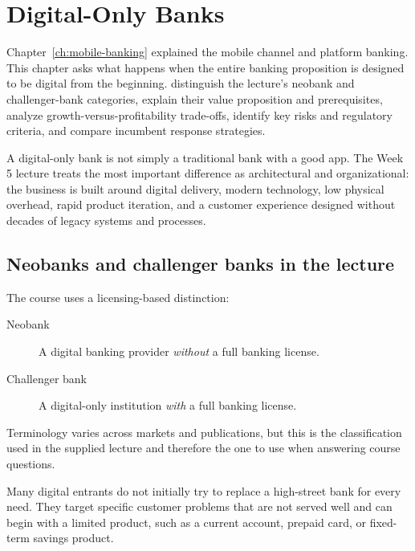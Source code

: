 \chapter{Digital-Only Banks}
\label{ch:digital-banks}

\chapterguide%
  {Chapter~\ref{ch:mobile-banking} explained the mobile channel and platform banking. This chapter asks what happens when the entire banking proposition is designed to be digital from the beginning.}
  {distinguish the lecture's neobank and challenger-bank categories, explain their value proposition and prerequisites, analyze growth-versus-profitability trade-offs, identify key risks and regulatory criteria, and compare incumbent response strategies.}

A digital-only bank is not simply a traditional bank with a good app. The Week 5 lecture treats the most important difference as architectural and organizational: the business is built around digital delivery, modern technology, low physical overhead, rapid product iteration, and a customer experience designed without decades of legacy systems and processes.

\section{Neobanks and challenger banks in the lecture}

The course uses a licensing-based distinction:

\begin{description}
  \item[Neobank] A digital banking provider \emph{without} a full banking license.
  \item[Challenger bank] A digital-only institution \emph{with} a full banking license.
\end{description}

Terminology varies across markets and publications, but this is the classification used in the supplied lecture and therefore the one to use when answering course questions.

Many digital entrants do not initially try to replace a high-street bank for every need. They target specific customer problems that are not served well and can begin with a limited product, such as a current account, prepaid card, or fixed-term savings product.

